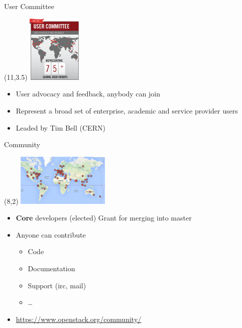 \begin{frame}{User Committee}
  \begin{textblock}{}(11,3.5)
      \includegraphics[width=7em]{img/osgraphicusercommittee}
  \end{textblock}
  \begin{itemize}
    \item User advocacy and feedback, anybody can join
      \medskip
    \item Represent a broad set of enterprise, academic and service provider users
      \medskip
    \item Leaded by Tim Bell (CERN)
  \end{itemize}
\end{frame}

\begin{frame}{Community}
  \begin{textblock}{}(8,2)
      \includegraphics[width=12em]{img/oscommunity}
  \end{textblock}
  \begin{itemize}
    \item \textbf{Core} developers (elected) Grant for merging into master
      \medskip
    \item Anyone can contribute
      \begin{itemize}
        \item Code
        \item Documentation
        \item Support (irc, mail)
        \item …
      \end{itemize}
      \medskip
    \item \url{https://www.openstack.org/community/}
  \end{itemize}
\end{frame}

